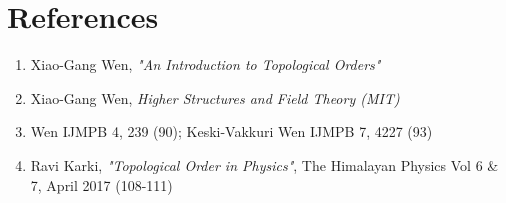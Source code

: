 \documentclass[11pt]{article}
\begin{document}
\section*{References}
\begin{enumerate}
    \item Xiao-Gang Wen, \emph{"An Introduction to Topological Orders"}
    \item Xiao-Gang Wen, \emph{Higher Structures and Field Theory (MIT)}
    \item Wen IJMPB 4, 239 (90); Keski-Vakkuri Wen IJMPB 7, 4227 (93)
    \item Ravi Karki, \emph{"Topological Order in Physics"}, The Himalayan Physics Vol 6 \& 7, April 2017 (108-111)
\end{enumerate}
\end{document}
